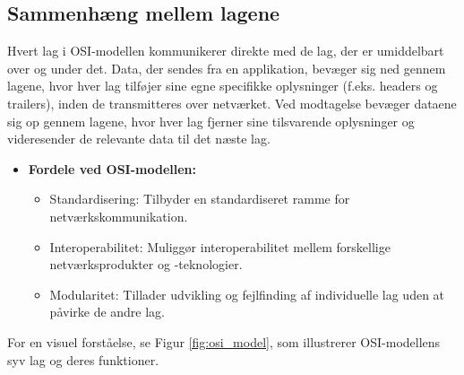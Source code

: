 \subsection{Sammenhæng mellem lagene}
Hvert lag i OSI-modellen kommunikerer direkte med de lag, der er umiddelbart over og under det. Data, der sendes fra en applikation, bevæger sig ned gennem lagene, hvor hver lag tilføjer sine egne specifikke oplysninger (f.eks. headers og trailers), inden de transmitteres over netværket. Ved modtagelse bevæger dataene sig op gennem lagene, hvor hver lag fjerner sine tilsvarende oplysninger og videresender de relevante data til det næste lag.
\begin{itemize}
	\item \textbf{Fordele ved OSI-modellen:}
	\begin{itemize}
		\item Standardisering: Tilbyder en standardiseret ramme for netværkskommunikation.
		\item Interoperabilitet: Muliggør interoperabilitet mellem forskellige netværksprodukter og -teknologier.
		\item Modularitet: Tillader udvikling og fejlfinding af individuelle lag uden at påvirke de andre lag.
	\end{itemize}
\end{itemize}
For en visuel forståelse, se Figur \ref{fig:osi_model}, som illustrerer OSI-modellens syv lag og deres funktioner.

